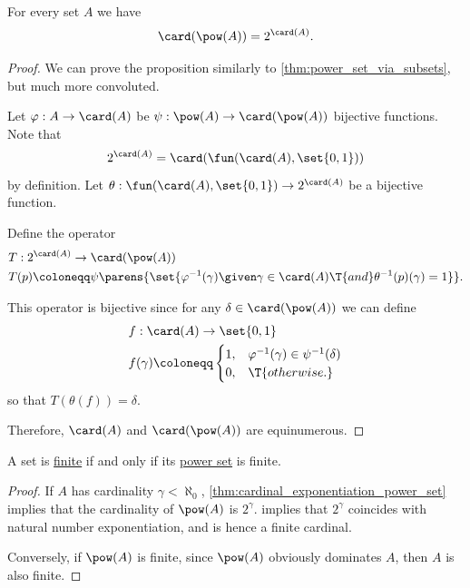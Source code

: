 \begin{proposition}\label{thm:cardinal_exponentiation_power_set}
  For every set \( A \) we have
  \begin{equation*}
    \card(\pow(A)) = 2^{\card(A)}.
  \end{equation*}
\end{proposition}
\begin{proof}
  We can prove the proposition similarly to \cref{thm:power_set_via_subsets}, but much more convoluted.

  Let \( \varphi: A \to \card(A) \) be \( \psi: \pow(A) \to \card(\pow(A)) \) bijective functions. Note that
  \begin{equation*}
    2^{\card(A)} = \card(\fun(\card(A), \set{ 0, 1 }))
  \end{equation*}
  by definition. Let \( \theta: \fun(\card(A), \set{ 0, 1 }) \to 2^{\card(A)} \) be a bijective function.

  Define the operator
  \begin{equation*}
    \begin{aligned}
      &T: 2^{\card(A)} \to \card(\pow(A)) \\
      &T(p) \coloneqq \psi\parens{ \set{ \varphi^{-1}(\gamma) \given \gamma \in \card(A) \T{and} \theta^{-1}(p)(\gamma) = 1 } }.
    \end{aligned}
  \end{equation*}

  This operator is bijective since for any \( \delta \in \card(\pow(A)) \) we can define
  \begin{equation*}
    \begin{aligned}
      &f: \card(A) \to \set{ 0, 1 } \\
      &f(\gamma) \coloneqq \begin{cases}
        1, &\varphi^{-1}(\gamma) \in \psi^{-1}(\delta) \\
        0, &\T{otherwise.}
      \end{cases}
    \end{aligned}
  \end{equation*}
  so that \( T(\theta(f)) = \delta \).

  Therefore, \( \card(A) \) and \( \card(\pow(A)) \) are equinumerous.
\end{proof}

\begin{corollary}\label{thm:cardinal_exponentiation_comparison}
  A set is \hyperref[def:aleph_zero_related_cardinalities]{finite} if and only if its \hyperref[def:power_set]{power set} is finite.
\end{corollary}
\begin{proof}
  \SufficiencySubProof If \( A \) has cardinality \( \gamma < \aleph_0 \), \cref{thm:cardinal_exponentiation_power_set} implies that the cardinality of \( \pow(A) \) is \( 2^\gamma \).  implies that \( 2^\gamma \) coincides with natural number exponentiation, and is hence a finite cardinal.

  \NecessitySubProof Conversely, if \( \pow(A) \) is finite, since \( \pow(A) \) obviously dominates \( A \), then \( A \) is also finite.
\end{proof}

